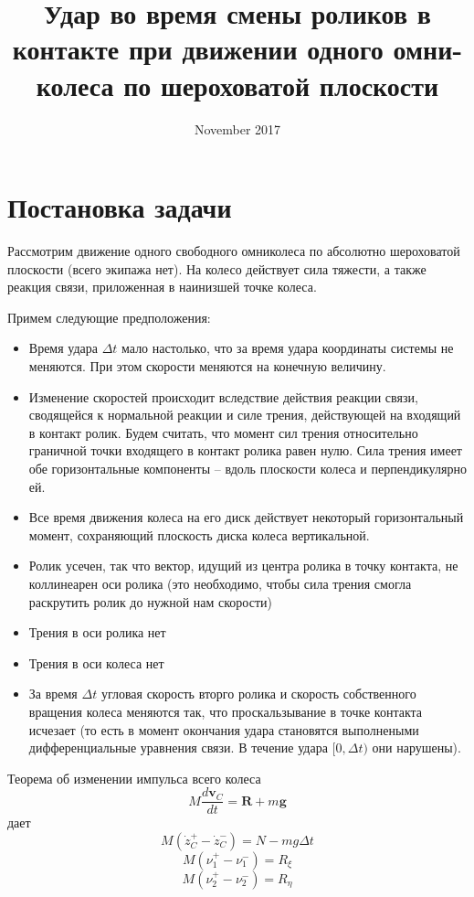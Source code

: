 \documentclass{article}
\title{Удар во время смены роликов в контакте при движении одного омни-колеса по шероховатой плоскости}
\date{November 2017}
\newcommand{\bs}[1]{\boldsymbol{#1}}
\begin{document}
\maketitle

\section{Постановка задачи}
Рассмотрим движение одного свободного омниколеса по абсолютно шероховатой плоскости (всего экипажа нет). На колесо действует сила тяжести, а также реакция связи, приложенная в наинизшей точке колеса.

Примем следующие предположения:
\begin{itemize}
\item Время удара $\Delta t$ мало настолько, что за время удара координаты системы не меняются. При этом скорости меняются на конечную величину.
\item Изменение скоростей происходит вследствие действия реакции связи, сводящейся к нормальной реакции и силе трения, действующей на входящий в контакт ролик. Будем считать, что момент сил трения относительно граничной точки входящего в контакт ролика равен нулю. Сила трения имеет обе горизонтальные компоненты -- вдоль плоскости колеса и перпендикулярно ей.
\item Все время движения колеса на его диск действует некоторый горизонтальный момент, сохраняющий плоскость диска колеса вертикальной.
\item Ролик усечен, так что вектор, идущий из центра ролика в точку контакта, не коллинеарен оси ролика (это необходимо, чтобы сила трения смогла раскрутить ролик до нужной нам скорости)
\item Трения в оси ролика нет
\item Трения в оси колеса нет
\item За время $\Delta t$ угловая скорость вторго ролика и скорость собственного вращения колеса меняются так, что проскальзывание в точке контакта исчезает (то есть в момент окончания удара становятся выполнеными дифференциальные уравнения связи. В течение удара $[0,\Delta t)$ они нарушены).
\end{itemize}


Теорема об изменении импульса всего колеса
$$
M\frac{d\bs{v}_C}{dt} = \bs{R} + m\bs{g}
$$
дает
$$
M(\dot{z}_C^+ - \dot{z}_C^-) = N-mg\Delta t
$$
\begin{equation}
    M(\nu_1^+ - \nu_1^-) = R_\xi
\end{equation}
\begin{equation}
M(\nu_2^+ - \nu_2^-) = R_\eta
\end{equation}
\end{document}
